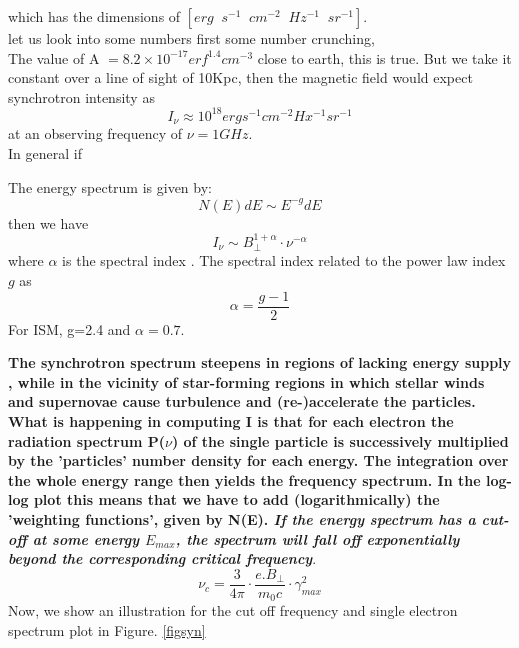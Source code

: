 \documentclass[12pt]{report}
\newcommand{\tit}[1]{\textit{#1}}
\newcommand{\cbox}{tcolorbox}
\newcommand{\rr}[1]{\left[{#1}\right]}
\begin{document}
which has the dimensions of $\rr{erg\;\;s^{-1}\;\;cm^{-2}\;\;Hz^{-1}\;\;sr^{-1}}$.\\
let us look into some numbers first some number crunching, \\
The value of A $=8.2 \times 10^{-17}erf^{1.4}cm^{-3}$ close to earth, this is true. But we take it constant over a line of sight of 10Kpc, then the magnetic field would expect synchrotron intensity as
\begin{equation}
I_\nu \approx 10^{18} erg s^{-1} cm^{-2} Hx^{-1} sr^{-1}
\end{equation} 
at an observing frequency of $\nu =1GHz$.\\
In general if
\begin{\cbox}
The energy spectrum is given by:
\begin{equation}
N(E)dE\sim E^{-g}dE
\end{equation}
then we have
\begin{equation}
I_\nu \sim B_{\perp}^{1+\alpha}\cdot \nu^{-\alpha}
\end{equation}
where $\alpha$ is the spectral index . The spectral index related to the power law index  $g$ as 
\begin{equation}
\alpha=\frac{g-1}{2}
\end{equation}
For ISM, g=2.4 and $\alpha=0.7$.
\end{\cbox}
\textbf{ The synchrotron spectrum steepens in regions of lacking energy supply , while in the vicinity of star-forming regions in which stellar winds and supernovae cause turbulence and (re-)accelerate the particles. What is happening in computing I
is that for each electron the radiation spectrum P($\nu$) of the single particle is successively multiplied by the 'particles' number density for each energy. The integration over the whole energy range then yields the frequency spectrum. In the log-log plot this means that we have to add (logarithmically) the 'weighting functions', given by N(E). \tit{If the energy spectrum has a cut-off at some energy $E_{max}$, the spectrum will fall off exponentially beyond the corresponding critical frequency}}.
\begin{equation}
\nu_c=\frac{3}{4 \pi}\cdot \frac{e. B_{\perp}}{m_0c}\cdot \gamma^2_{max}
\end{equation}
Now, we show an illustration for the cut off frequency and single electron spectrum plot in Figure. \ref{figsyn}
\end{document}
